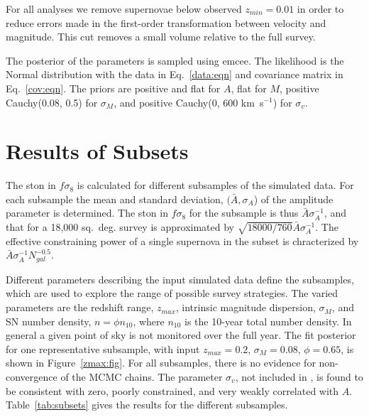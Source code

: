 \documentclass{aastex62}   	%
\begin{document}
For all analyses we remove supernovae below observed $z_{min}=0.01$ in order to
reduce errors made in the first-order transformation between velocity and
magnitude.  This cut removes a  small volume relative to the full survey.

The posterior of the parameters is sampled using emcee.  The likelihood is the Normal distribution with the data in Eq.~\ref{data:eqn} and
covariance matrix in Eq.~\ref{cov:eqn}.
The priors are positive and flat for $A$, flat for $M$, positive Cauchy(0.08, 0.5) for $\sigma_M$, and  positive Cauchy(0, 600 km~s$^{-1}$) for $\sigma_{v}$.


\section{Results of Subsets}

The  ston in $f\sigma_8$ is calculated for different subsamples of the simulated data.
For each subsample  the mean  and standard deviation, $(\bar{A}, \sigma_A$) of the amplitude parameter is
determined.  The ston in $f\sigma_8$ for the subsample is thus  $\bar{A} \sigma^{-1}_A$, and that for a 18,000 sq.~deg. survey  is approximated by
$\sqrt{18000/760}\bar{A}\sigma^{-1}_A$.  The effective constraining power of a single supernova in the subset is chracterized by 
 $\bar{A} \sigma^{-1}_A N_{gal}^{-0.5}$.

Different parameters describing the input simulated data define the subsamples, 
which are used to explore the range of possible survey strategies.   The varied parameters are the redshift range, $z_{max}$, intrinsic
magnitude dispersion, $\sigma_M$, and SN number density, $n = \phi n_{10}$, where $ n_{10}$ is the  10-year total number density.  In general a given point
of sky is not monitored over the full year.  
The fit posterior for one representative subsample, with input  $z_{max}=0.2$, $\sigma_M=0.08$, $\phi=0.65$, is shown in Figure~\ref{zmax:fig}.
For all subsamples, there is no evidence for non-convergence of the MCMC chains.  The parameter $\sigma_v$, not included in  \citet{2015JCAP...12..033H, 2017JCAP...05..015H},
is found to be consistent with zero, poorly constrained, and very weakly correlated with $A$.  Table~\ref{tab:subsets} gives the results for the different subsamples.
\end{document}
